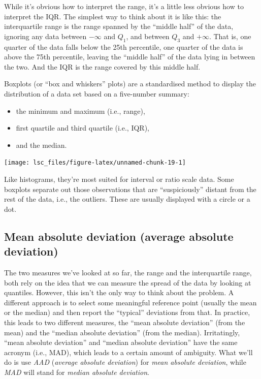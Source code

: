 \documentclass[
  11pt,
]{book}
\providecommand{\tightlist}{%
  \setlength{\itemsep}{0pt}\setlength{\parskip}{0pt}}
\theoremstyle{definition}
\theoremstyle{definition}
\theoremstyle{definition}
\theoremstyle{definition}
\theoremstyle{remark}
\begin{document}
While it's obvious how to interpret the range, it's a little less obvious how to interpret the IQR. The simplest way to think about it is like this: the interquartile range is the range spanned by the ``middle half'' of the data, ignoring any data between \(-\infty\) and \(Q_1\), and between \(Q_3\) and \(+\infty\). That is, one quarter of the data falls below the 25th percentile, one quarter of the data is above the 75th percentile, leaving the ``middle half'' of the data lying in between the two. And the IQR is the range covered by this middle half.

\hypertarget{boxplot}{}
\begin{callout}[Boxplots]

Boxplots (or ``box and whiskers'' plots) are a standardised method to display the distribution of a data set based on a five-number summary:

\begin{itemize}
\tightlist
\item
  the minimum and maximum (i.e., range),
\item
  first quartile and third quartile (i.e., IQR),
\item
  and the median.
\end{itemize}

\begin{center}\texttt{[image: lsc\_files/figure-latex/unnamed-chunk-19-1]} \end{center}

Like histograms, they're most suited for interval or ratio scale data. Some boxplots separate out those observations that are ``suspiciously'' distant from the rest of the data, i.e., the outliers. These are usually displayed with a circle or a dot.

\end{callout}

\hypertarget{aad}{%
\subsection{Mean absolute deviation (average absolute deviation)}\label{aad}}

The two measures we've looked at so far, the range and the interquartile range, both rely on the idea that we can measure the spread of the data by looking at quantiles. However, this isn't the only way to think about the problem. A different approach is to select some meaningful reference point (usually the mean or the median) and then report the ``typical'' deviations from that. In practice, this leads to two different measures, the ``mean absolute deviation'' (from the mean) and the ``median absolute deviation'' (from the median). Irritatingly, ``mean absolute deviation'' and ``median absolute deviation'' have the same acronym (i.e., MAD), which leads to a certain amount of ambiguity. What we'll do is use \emph{AAD} (\emph{average absolute deviation}) for \emph{mean absolute deviation}, while \emph{MAD} will stand for \emph{median absolute deviation}.
\end{document}
